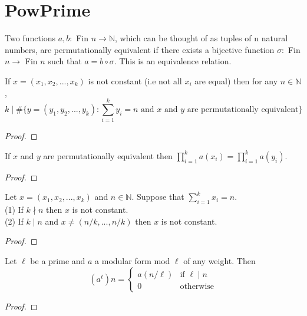 \section{PowPrime}


\begin{definition} 
  \label{def:perm_equiv}
  \leanok
  Two functions $a, b : $ Fin $n \to \mathbb{N}$, which can be thought of as tuples of n natural numbers,
  are permutationally equivalent if there exists a bijective function $\sigma : $ Fin $n \to $ Fin $n$ such that 
  $a = b \circ \sigma$. This is an equivalence relation. 
\end{definition}

\begin{lemma}
  \label{lem:non_diag_vanish}
  \leanok
  If $x = (x_1, x_2, ..., x_k)$ is not constant (i.e not all $x_i$ are equal) then for any $n \in \mathbb{N}$,
  \[ k \mid \# \{y = (y_1, y_2, ..., y_k) : \sum_{i = 1}^k y_i = n \text{   and $x$ and $y$ are permutationally equivalent} \} \]
\end{lemma}
\begin{proof}
  \leanok
\end{proof}

\begin{lemma}
  \label{lem:Pi_eq_of_perm_equiv}
  \leanok
  If $x$ and $y$ are permutationally equivalent then $\prod_{i = 1}^k a(x_i) = \prod_{i = 1}^k a(y_i)$.
\end{lemma}
\begin{proof}
  \leanok
\end{proof}

\begin{lemma}
  \label{lem:non_const_of_tuple}
  \leanok
  Let $x = (x_1, x_2, ..., x_k)$ and $n \in \mathbb{N}$. Suppose that $\sum_{i = 1}^k x_i = n$. \\
  (1) If $k \nmid n$ then $x$ is not constant. \\
  (2) If $k \mid n$ and $x \neq (n/k, ..., n/k)$ then $x$ is not constant.
\end{lemma}
\begin{proof}
  \leanok
\end{proof}

\begin{theorem} 
  \label{thm:Pow_Prime}
  \leanok
  Let $\ell$ be a prime and $a$ a modular form mod $\ell$ of any weight. Then \\
  \[(a ^ \ell) n = \begin{cases} a (n / \ell) & \text{if $\ell \mid n$} \\
    0 & \text{otherwise} \end{cases} \]
\end{theorem}
\begin{proof}
  \leanok
\end{proof}



